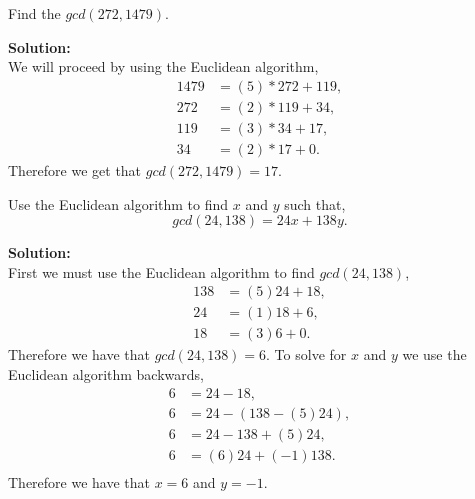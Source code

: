 \documentclass[12pt]{article}
\makeatletter
\theoremstyle{homework}
\newenvironment{exercise}[1]
{\def\@currentlabel{#1}\exercisecore}
{\endexercisecore}
\newcommand{\localhead}[1]{\par\smallskip\noindent\textbf{#1}\nobreak\\}%
\newcommand\solution{\localhead{Solution:}}
\makeatother
\begin{document}
\begin{exercise}{15} Find the $gcd(272,1479)$.\\
  \solution We will proceed by using the Euclidean algorithm, 
  \begin{align*}
    1479 &= (5)*272 + 119,\\
    272 &= (2)*119 + 34,\\
    119 &= (3)*34 + 17,\\
    34 &= (2)*17 + 0.
  \end{align*}
  Therefore we get that $gcd(272,1479) = 17$.
\end{exercise}
\vspace{.5in}






\begin{exercise}{16b} Use the Euclidean algorithm to find $x$ and $y$ such that, 
  \begin{equation*}
    gcd(24,138) = 24x + 138y. 
  \end{equation*}

  \solution First we must use the Euclidean algorithm to find $gcd(24,138)$,
\begin{align*}
  138 &= (5)24 + 18,\\
  24 &= (1)18 + 6,\\
  18 &= (3)6 + 0.
\end{align*}
Therefore we have that $gcd(24,138) = 6$. To solve for $x$ and $y$ we use the Euclidean algorithm
backwards, 
\begin{align*}
  6 &= 24 - 18,\\
  6 &= 24 - (138 - (5)24),\\
  6 &= 24 - 138 + (5)24,\\
  6 &= (6)24 + (-1)138.\\
\end{align*}
Therefore we have that $x = 6$ and $y = -1$.

\end{exercise}
\vspace{.5in}
\end{document}
